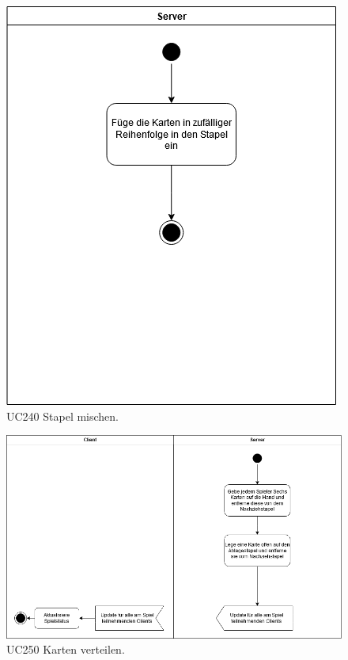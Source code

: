 \begin{figure}[h]
	\centering
	\includegraphics[width=\textwidth]{ad/UC240_Stapel_mischen_v2.png}
	\caption{UC240 Stapel mischen.}
\end{figure}

\begin{figure}[h]
	\centering
	\includegraphics[width=\textwidth]{ad/UC250_Karten_verteilen.png}
	\caption{UC250 Karten verteilen.}
\end{figure}

